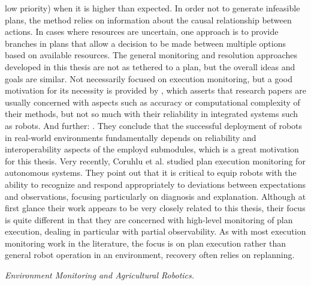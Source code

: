 \documentclass[english, master, utf8]{base/thesis_KBS}
\begin{document}
low priority) when it is higher than expected. In order not to generate infeasible plans, the method relies on information about the causal relationship between actions. In cases
where resources are uncertain, one approach is to provide branches in plans that allow a decision to be made between multiple options based on available resources. \cite{Harris:2021}
The general monitoring and resolution approaches developed in this thesis are not as tethered to a plan, but the overall ideas and goals are similar.\newline
Not necessarily focused on execution monitoring, but a good motivation for its necessity is provided by \cite{Roucek:2021}, which asserts that research papers are
usually concerned with aspects such as accuracy or computational complexity of their methods, but not so much with their reliability in integrated systems such as robots.
And further: .
\cite{Roucek:2021} They conclude that the successful deployment of robots in real-world environments fundamentally depends on reliability and interoperability aspects of the
employd submodules, which is a great motivation for this thesis.\newline
Very recently, Coruhlu et al. \cite{Coruhlu:2021} studied plan execution monitoring for autonomous systems. They point out that it is critical to equip robots with the ability
to recognize and respond appropriately to deviations between expectations and observations, focusing particularly on diagnosis and explanation. Although at first glance their work
appears to be very closely related to this thesis, their focus is quite different in that they are concerned with high-level monitoring of plan execution, dealing in particular with
partial observability. As with most execution monitoring work in the literature, the focus is on plan execution rather than general robot operation in an environment, recovery often
relies on replanning.\newline

\noindent
\textit{Environment Monitoring and Agricultural Robotics.}\newline
\end{document}

